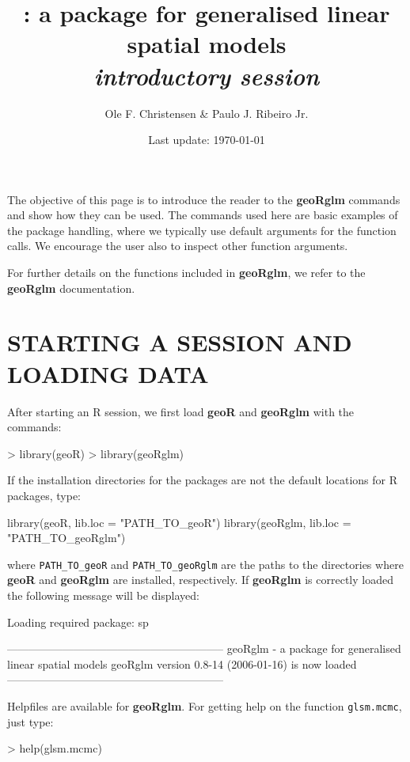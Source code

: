 \documentclass[12pt,a4paper]{article}
\title{\pkg{geoRglm} : a package for  generalised linear spatial models
\\{\it introductory session}}
\author{Ole F. Christensen \& Paulo J. Ribeiro Jr.}
\date{Last update: \today}
\newcommand{\strong}[1]{{\textbf{ #1}}}
\let\pkg=\strong
\newcommand{\code}[1]{\texttt{\small #1}}
\newcommand{\R}{{\textsf{R}}{}}
\begin{document}
\maketitle




The objective of this page is to introduce the reader to the 
\pkg{geoRglm} commands and show how they can be used.
The commands used here are basic examples of the package handling, where we typically use default arguments for the function calls.
We encourage the user also to inspect other function arguments.

For further details on the functions included in \pkg{geoRglm}, we refer to the \pkg{geoRglm} documentation.

\section{STARTING A SESSION AND LOADING DATA}
After starting an \R{} session, we first load \pkg{geoR} and \pkg{geoRglm} with the commands:
\begin{Schunk}
\begin{Sinput}
> library(geoR)
> library(geoRglm)
\end{Sinput}
\end{Schunk}

If the installation directories for the packages are not the default locations for \R{} packages, type:
\begin{Rin}
  library(geoR, lib.loc = "PATH_TO_geoR")
  library(geoRglm, lib.loc = "PATH_TO_geoRglm")
\end{Rin}
where \verb+PATH_TO_geoR+ and \verb+PATH_TO_geoRglm+ are the paths to the directories where \pkg{geoR} and \pkg{geoRglm} are installed, respectively.
If \pkg{geoRglm} is correctly loaded the following message will be displayed:
\begin{Schunk}
\begin{Soutput}
Loading required package: sp
\end{Soutput}
\begin{Soutput}
-----------------------------------------------------------
geoRglm - a package for generalised linear spatial models
geoRglm version 0.8-14 (2006-01-16) is now loaded
-----------------------------------------------------------
\end{Soutput}
\end{Schunk}
Helpfiles are available for \pkg{geoRglm}. For getting help on the function \code{glsm.mcmc}, just type:  
\begin{Rin}
> help(glsm.mcmc)
\end{Rin}
\end{document}
